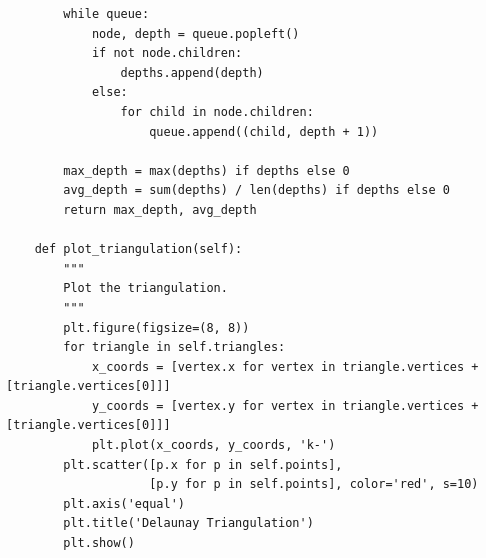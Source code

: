 \documentclass{article}
\begin{document}
\begin{verbatim}
        while queue:
            node, depth = queue.popleft()
            if not node.children:
                depths.append(depth)
            else:
                for child in node.children:
                    queue.append((child, depth + 1))

        max_depth = max(depths) if depths else 0
        avg_depth = sum(depths) / len(depths) if depths else 0
        return max_depth, avg_depth
    
    def plot_triangulation(self):
        """
        Plot the triangulation.
        """
        plt.figure(figsize=(8, 8))
        for triangle in self.triangles:
            x_coords = [vertex.x for vertex in triangle.vertices + [triangle.vertices[0]]]
            y_coords = [vertex.y for vertex in triangle.vertices + [triangle.vertices[0]]]
            plt.plot(x_coords, y_coords, 'k-')
        plt.scatter([p.x for p in self.points], 
                    [p.y for p in self.points], color='red', s=10)
        plt.axis('equal')
        plt.title('Delaunay Triangulation')
        plt.show()
\end{verbatim}
\end{document}
